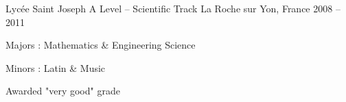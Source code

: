 \begin{cventries}
  \cventry
    {Lycée Saint Joseph} %
		{A Level -- Scientific Track} %
    {La Roche sur Yon, France} %
    {2008 -- 2011} %
    {
      \begin{cvitems} %
				\item {Majors : Mathematics \& Engineering Science}
				\item {Minors : Latin \& Music}
        \item {Awarded "very good" grade}
      \end{cvitems}
    }
\end{cventries}
